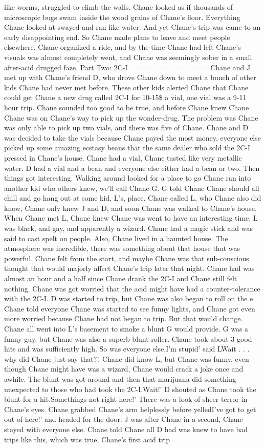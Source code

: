 \documentclass[12pt]{book}
\begin{document}
like worms, struggled to climb the walls. Chane looked as if thousands of microscopic bugs swam inside the wood grains of Chane's floor. Everything Chane looked at swayed and ran like water. And yet Chane's trip was came to an early disappointing end. So Chane made plans to leave and meet people elsewhere. Chane organized a ride, and by the time Chane had left Chane's visuals was almost completely went, and Chane was seemingly sober in a small after-acid drugged faze. Part Two: 2C-I ============== Chane and J met up with Chane's friend D, who drove Chane down to meet a bunch of other kids Chane had never met before. These other kids alerted Chane that Chane could get Chane a new drug called 2C-I for 10-15\$ a vial, one vial was a 9-11 hour trip. Chane sounded too good to be true, and before Chane knew Chane Chane was on Chane's way to pick up the wonder-drug. The problem was Chane was only able to pick up two vials, and there was five of Chane. Chane and D was decided to take the vials because Chane payed the most money, everyone else picked up some amazing ecstasy beans that the same dealer who sold the 2C-I pressed in Chane's house. Chane had a vial, Chane tasted like very metallic water. D had a vial and a bean and everyone else either had a bean or two. Then things got interesting. Walking around looked for a place to go Chane ran into another kid who others knew, we'll call Chane G. G told Chane Chane should all chill and go hang out at some kid, L's, place. Chane called L, who Chane also did know, Chane only knew J and D, and soon Chane was walked to Chane's house. When Chane met L, Chane knew Chane was went to have an interesting time. L was black, and gay, and apparently a wizard. Chane had a magic stick and was said to cast spelt on people. Also, Chane lived in a haunted house. The atmosphere was incredible, there was something about that house that was powerful. Chane felt from the start, and maybe Chane was that sub-conscious thought that would majorly affect Chane's trip later that night. Chane had was almost an hour and a half since Chane drank the 2C-I and Chane still felt nothing. Chane was got worried that the acid might have had a counter-tolerance with the 2C-I. D was started to trip, but Chane was also began to roll on the e. Chane told everyone Chane was started to see funny lights, and Chane got even more worried because Chane had not began to trip. But that would change. Chane all went into L's basement to smoke a blunt G would provide. G was a funny guy, but Chane was also a superb blunt roller. Chane took about 3 good hits and was sufficiently high. So was everyone else.I'm stupid' said LWait . . .  why did Chane just say that?'. Chane did know L, but Chane was funny, even though Chane might have was a wizard, Chane would crack a joke once and awhile. The blunt was got around and then that marijuana did something unexpected to those who had took the 2C-I.Wait!' D shouted as Chane took the blunt for a hit.Somethings not right here!' There was a look of sheer terror in Chane's eyes. Chane grabbed Chane's arm helplessly before yelledI've got to get out of here!' and headed for the door. J was after Chane in a second, Chane stayed with everyone else. Chane told Chane all D had was knew to have bad trips like this, which was true, Chane's first acid trip 
\end{document}
